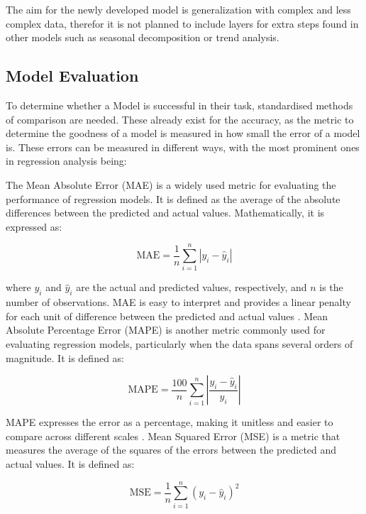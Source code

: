 \documentclass{article}
\begin{document}
The aim for the newly developed model is generalization with complex and less complex data, therefor it is not planned to include layers for extra steps found in other models such as seasonal decomposition or trend analysis.

\subsection{Model Evaluation}

To determine whether a Model is successful in their task, standardised methods of comparison are needed. These already exist for the accuracy, as the metric to determine the goodness of a model is measured in how small the error of a model is. These errors can be measured in different ways, with the most prominent ones in regression analysis being:

The Mean Absolute Error (MAE) is a widely used metric for evaluating the performance of regression models. It is defined as the average of the absolute differences between the predicted and actual values. Mathematically, it is expressed as:

\begin{equation}
\text{MAE} = \frac{1}{n} \sum_{i=1}^{n} \left| y_i - \hat{y}_i \right|
\end{equation}

where \(y_i\) and \(\hat{y}_i\) are the actual and predicted values, respectively, and \(n\) is the number of observations. MAE is easy to interpret and provides a linear penalty for each unit of difference between the predicted and actual values \cite{MAE_RMSE}.
Mean Absolute Percentage Error (MAPE) is another metric commonly used for evaluating regression models, particularly when the data spans several orders of magnitude. It is defined as:

\begin{equation}
\text{MAPE} = \frac{100}{n} \sum_{i=1}^{n} \left| \frac{y_i - \hat{y}_i}{y_i} \right|
\end{equation}

MAPE expresses the error as a percentage, making it unitless and easier to compare across different scales \cite{MAPE}.
Mean Squared Error (MSE) is a metric that measures the average of the squares of the errors between the predicted and actual values. It is defined as:

\begin{equation}
\text{MSE} = \frac{1}{n} \sum_{i=1}^{n} (y_i - \hat{y}_i)^2
\end{equation}
\end{document}
